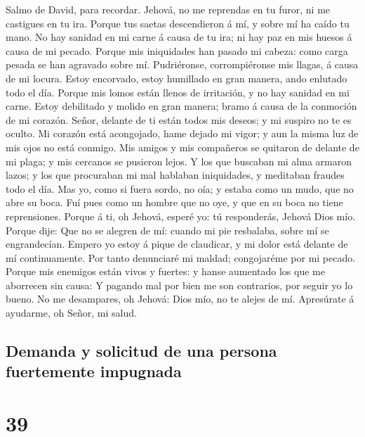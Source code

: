  Salmo de David, para recordar. Jehová, no me reprendas en
tu furor, ni me castigues en tu ira.  Porque tus saetas
descendieron á mí, y sobre mí ha caído tu mano.  No hay
sanidad en mi carne á causa de tu ira; ni hay paz en mis huesos á causa
de mi pecado.  Porque mis iniquidades han pasado mi
cabeza: como carga pesada se han agravado sobre mí. 
Pudriéronse, corrompiéronse mis llagas, á causa de mi locura.
 Estoy encorvado, estoy humillado en gran manera, ando
enlutado todo el día.  Porque mis lomos están llenos de
irritación, y no hay sanidad en mi carne.  Estoy
debilitado y molido en gran manera; bramo á causa de la conmoción de mi
corazón.  Señor, delante de ti están todos mis deseos; y
mi suspiro no te es oculto.  Mi corazón está acongojado,
hame dejado mi vigor; y aun la misma luz de mis ojos no está conmigo.
 Mis amigos y mis compañeros se quitaron de delante de mi
plaga; y mis cercanos se pusieron lejos.  Y los que
buscaban mi alma armaron lazos; y los que procuraban mi mal hablaban
iniquidades, y meditaban fraudes todo el día.  Mas yo,
como si fuera sordo, no oía; y estaba como un mudo, que no abre su boca.
 Fuí pues como un hombre que no oye, y que en su boca no
tiene reprensiones.  Porque á ti, oh Jehová, esperé yo:
tú responderás, Jehová Dios mío.  Porque dije: Que no se
alegren de mí: cuando mi pie resbalaba, sobre mí se engrandecían.
 Empero yo estoy á pique de claudicar, y mi dolor está
delante de mí continuamente.  Por tanto denunciaré mi
maldad; congojaréme por mi pecado.  Porque mis enemigos
están vivos y fuertes: y hanse aumentado los que me aborrecen sin causa:
 Y pagando mal por bien me son contrarios, por seguir yo
lo bueno.  No me desampares, oh Jehová: Dios mío, no te
alejes de mí.  Apresúrate á ayudarme, oh Señor, mi salud.

\hypertarget{demanda-y-solicitud-de-una-persona-fuertemente-impugnada}{%
\subsection{Demanda y solicitud de una persona fuertemente
impugnada}\label{demanda-y-solicitud-de-una-persona-fuertemente-impugnada}}

\hypertarget{section-38}{%
\section{39}\label{section-38}}

